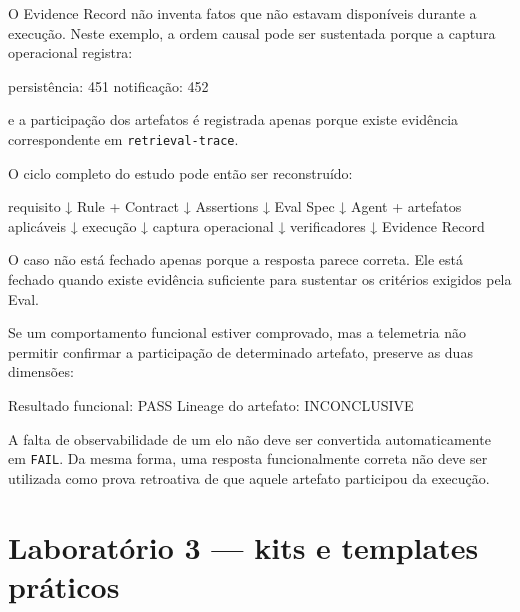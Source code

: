 \documentclass[
  10pt,
  a4paper,
  oneside]{book}
\newenvironment{Shaded}{}{}
\newcommand{\NormalTok}[1]{#1}
\renewenvironment{Shaded}{\begin{snugshade}}{\end{snugshade}}%
\begin{document}
O Evidence Record não inventa fatos que não estavam disponíveis durante
a execução. Neste exemplo, a ordem causal pode ser sustentada porque a
captura operacional registra:

\begin{Shaded}
\begin{Highlighting}[]
\NormalTok{persistência: 451}
\NormalTok{notificação: 452}
\end{Highlighting}
\end{Shaded}

e a participação dos artefatos é registrada apenas porque existe
evidência correspondente em \texttt{retrieval-trace}.

O ciclo completo do estudo pode então ser reconstruído:

\begin{Shaded}
\begin{Highlighting}[]
\NormalTok{requisito}
\NormalTok{        ↓}
\NormalTok{Rule + Contract}
\NormalTok{        ↓}
\NormalTok{Assertions}
\NormalTok{        ↓}
\NormalTok{Eval Spec}
\NormalTok{        ↓}
\NormalTok{Agent + artefatos aplicáveis}
\NormalTok{        ↓}
\NormalTok{execução}
\NormalTok{        ↓}
\NormalTok{captura operacional}
\NormalTok{        ↓}
\NormalTok{verificadores}
\NormalTok{        ↓}
\NormalTok{Evidence Record}
\end{Highlighting}
\end{Shaded}

O caso não está fechado apenas porque a resposta parece correta. Ele
está fechado quando existe evidência suficiente para sustentar os
critérios exigidos pela Eval.

Se um comportamento funcional estiver comprovado, mas a telemetria não
permitir confirmar a participação de determinado artefato, preserve as
duas dimensões:

\begin{Shaded}
\begin{Highlighting}[]
\NormalTok{Resultado funcional: PASS}
\NormalTok{Lineage do artefato: INCONCLUSIVE}
\end{Highlighting}
\end{Shaded}

A falta de observabilidade de um elo não deve ser convertida
automaticamente em \texttt{FAIL}. Da mesma forma, uma resposta
funcionalmente correta não deve ser utilizada como prova retroativa de
que aquele artefato participou da execução.

\newpage

\hypertarget{laboratuxf3rio-3-kits-e-templates-pruxe1ticos}{%
\chapter{Laboratório 3 --- kits e templates
práticos}\label{laboratuxf3rio-3-kits-e-templates-pruxe1ticos}}
\end{document}
